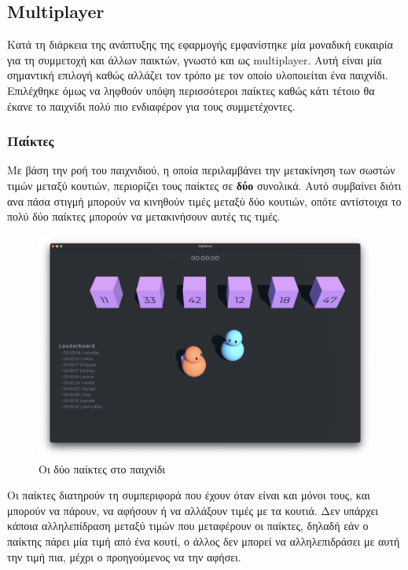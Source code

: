 \subsection{Multiplayer}

Κατά τη διάρκεια της ανάπτυξης της εφαρμογής εμφανίστηκε μία μοναδική ευκαιρία για τη συμμετοχή και άλλων παικτών, γνωστό και ως \gls{multiplayer}. Αυτή είναι μία σημαντική επιλογή καθώς αλλάζει τον τρόπο με τον οποίο υλοποιείται ένα παιχνίδι. Επιλέχθηκε όμως να ληφθούν υπόψη περισσότεροι παίκτες καθώς κάτι τέτοιο θα έκανε το παιχνίδι πολύ πιο ενδιαφέρον για τους συμμετέχοντες.

\subsubsection{Παίκτες}

Με βάση την ροή του παιχνιδιού, η οποία περιλαμβάνει την μετακίνηση των σωστών τιμών μεταξύ κουτιών, περιορίζει τους παίκτες σε \textbf{δύο} συνολικά. Αυτό συμβαίνει διότι ανα πάσα στιγμή μπορούν να κινηθούν τιμές μεταξύ δύο κουτιών, οπότε αντίστοιχα το πολύ δύο παίκτες μπορούν να μετακινήσουν αυτές τις τιμές.

\begin{figure}[H]
    \centering
    \includegraphics[width=0.8\linewidth]{sections/4/4/images/game_multiplayer}
    \caption{Οι δύο παίκτες στο παιχνίδι}
    \label{fig:game_multiplayer}
\end{figure}

Οι παίκτες διατηρούν τη συμπεριφορά που έχουν όταν είναι και μόνοι τους, και μπορούν να πάρουν, να αφήσουν ή να αλλάξουν τιμές με τα κουτιά. Δεν υπάρχει κάποια αλληλεπίδραση μεταξύ τιμών που μεταφέρουν οι παίκτες, δηλαδή εάν ο παίκτης πάρει μία τιμή από ένα κουτί, ο άλλος δεν μπορεί να αλληλεπιδράσει με αυτή την τιμή πια, μέχρι ο προηγούμενος να την αφήσει.

